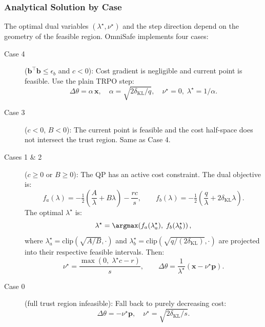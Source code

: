 \documentclass[12pt,a4paper]{article}
\theoremstyle{definition}
\newcommand{\bvec}{\mathbf{b}}
\newcommand{\xvec}{\mathbf{x}}
\newcommand{\pvec}{\mathbf{p}}
\begin{document}
\subsubsection{Analytical Solution by Case}

The optimal dual variables $(\lambda^\star, \nu^\star)$ and the step direction depend on
the geometry of the feasible region. OmniSafe implements four cases:

\begin{description}
  \item[Case 4] ($\bvec^\top\bvec \leq \epsilon_b$ and $c < 0$):
    Cost gradient is negligible and current point is feasible. Use the plain TRPO step:
    \begin{equation}
      \Delta\theta = \alpha\,\xvec, \quad \alpha = \sqrt{2\delta_{\mathrm{KL}}/q}, \quad \nu^\star=0,\; \lambda^\star = 1/\alpha.
    \end{equation}

  \item[Case 3] ($c < 0$, $B < 0$):
    The current point is feasible and the cost half-space does not intersect the trust region.
    Same as Case 4.

  \item[Cases 1 \& 2] ($c \geq 0$ or $B \geq 0$):
    The QP has an active cost constraint. The dual objective is:
    \begin{equation}
      f_a(\lambda) = -\tfrac{1}{2}\!\left(\frac{A}{\lambda} + B\lambda\right) - \frac{rc}{s},
      \qquad
      f_b(\lambda) = -\tfrac{1}{2}\!\left(\frac{q}{\lambda} + 2\delta_{\mathrm{KL}}\lambda\right).
    \end{equation}
    The optimal $\lambda^\star$ is:
    \begin{equation}
      \lambda^\star = \argmax\!\left(f_a(\lambda_a^\star),\; f_b(\lambda_b^\star)\right),
    \end{equation}
    where $\lambda_a^\star = \mathrm{clip}(\sqrt{A/B}, \cdot)$ and $\lambda_b^\star = \mathrm{clip}(\sqrt{q/(2\delta_{\mathrm{KL}})}, \cdot)$ are projected into their respective feasible intervals. Then:
    \begin{equation}
      \nu^\star = \frac{\max(0,\;\lambda^\star c - r)}{s},
      \qquad
      \Delta\theta = \frac{1}{\lambda^\star}(\xvec - \nu^\star\pvec).
    \end{equation}

  \item[Case 0] (full trust region infeasible):
    Fall back to purely decreasing cost:
    \begin{equation}
      \Delta\theta = -\nu^\star\pvec, \quad \nu^\star = \sqrt{2\delta_{\mathrm{KL}}/s}.
    \end{equation}
\end{description}
\end{document}
